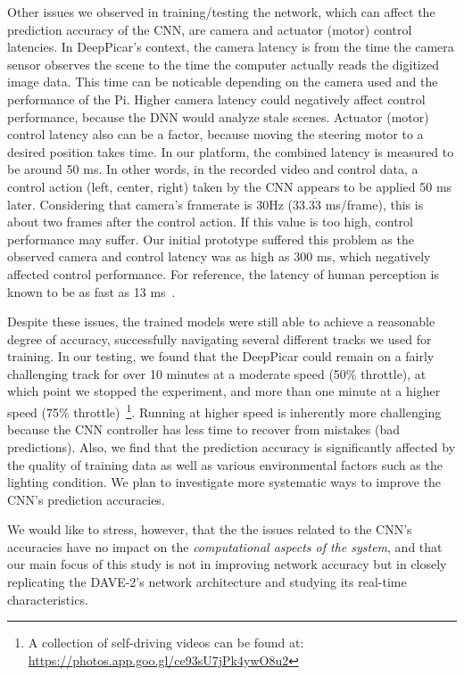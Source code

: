 Other issues we observed in training/testing the network, which
can affect the prediction accuracy of the CNN, are camera and actuator
(motor) control latencies. In DeepPicar's
context, the camera latency is from the time the camera
sensor observes the scene to the time the computer actually reads the
digitized image data. This time can be noticable depending on the camera 
used and the performance of the Pi. Higher camera latency could
negatively affect control performance, because the DNN would analyze
stale scenes. Actuator (motor) control latency also can be a
factor, because moving the steering motor to a desired position takes
time. 
In our platform, the combined latency is measured to be around
50 ms. In other words, in the recorded video and control data, a
control action (left, center, right) taken by the CNN appears to be
applied 50 ms later. Considering that camera's framerate is 30Hz
(33.$\overline{\mbox{33}}$ ms/frame), this is about two frames after the 
control action.
If this value is too high, control performance may suffer.
Our initial prototype suffered this problem as the observed camera and
control latency was as high as 300 ms, which negatively affected
control performance.
For reference, the latency of human perception is known to be as fast
as 13 ms~\cite{ThomasBurger2015}. 

Despite these issues, the trained models were still able to
achieve a reasonable degree of accuracy, successfully navigating
several different tracks we used for training. In our testing, we found 
that the DeepPicar could remain on a fairly challenging track for over 
10 minutes at a moderate speed (50\% throttle), at which point we stopped
the experiment, and more than one minute at a higher speed (75\%
throttle)~\footnote{A collection of self-driving videos can be found
  at: \url{https://photos.app.goo.gl/ce93sU7jPk4ywO8u2}}. Running at
higher speed is inherently more challenging because the CNN controller
has less time to recover from mistakes (bad predictions).  Also, we
find that the prediction accuracy is significantly affected by the
quality of training data as well as various environmental factors such
as the lighting condition. We plan to investigate more systematic ways
to improve the CNN's prediction accuracies.

We would like to stress, however, that the the issues related to the
CNN's accuracies have no impact on the \emph{computational 
aspects of the system}, and that our main focus of this study is
not in improving network accuracy but in closely replicating the
DAVE-2's network architecture and studying its real-time
characteristics.
